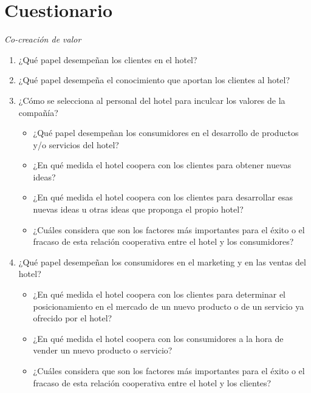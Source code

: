 \section*{Cuestionario}

\emph{Co-creación de valor}

\begin{enumerate}
	\item ¿Qué papel desempeñan los clientes en el hotel?
	\item ¿Qué papel desempeña el conocimiento que aportan los clientes al hotel?
	\item ¿Cómo se selecciona al personal del hotel para inculcar los valores de la compañía?

	\begin{itemize}
			\item ¿Qué papel desempeñan los consumidores en el desarrollo de productos y/o servicios del hotel?
			\item  ¿En qué medida el hotel coopera con los clientes para obtener nuevas ideas?
			\item ¿En qué medida el hotel coopera con los clientes para desarrollar esas nuevas ideas u otras ideas que proponga el propio hotel?
			\item ¿Cuáles considera que son los factores más importantes para el éxito o el fracaso de esta relación cooperativa entre el hotel y los consumidores?

	\end{itemize}

	\item ¿Qué papel desempeñan los consumidores en el marketing y en las ventas del hotel?

	\begin{itemize}
			\item ¿En qué medida el hotel coopera con los clientes para determinar el posicionamiento en el mercado de un nuevo producto o de un servicio ya ofrecido por el hotel?
			\item ¿En qué medida el hotel coopera con los consumidores a la hora de vender un nuevo producto o servicio?
			\item ¿Cuáles considera que son los factores más importantes para el éxito o el fracaso de esta relación cooperativa entre el hotel y los clientes?

	\end{itemize}


\end{enumerate}

\newpage

